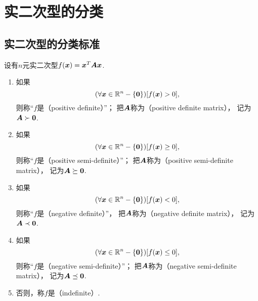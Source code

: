 \section{实二次型的分类}
\subsection{实二次型的分类标准}
\begin{definition}\label{definition:实二次型的分类.实二次型的分类}
设有\(n\)元实二次型\(f(\boldsymbol{x}) = \boldsymbol{x}^T\boldsymbol{A}\boldsymbol{x}\).
\begin{enumerate}
	\item 如果\[
		(\forall\boldsymbol{x}\in\mathbb{R}^n-\{\boldsymbol0\})
		[f(\boldsymbol{x}) > 0],
	\]
	则称“\(f\)是（positive definite）”；
	把\(\boldsymbol{A}\)称为（positive definite matrix），
	记为\(\boldsymbol{A}\succ\boldsymbol0\).

	\item 如果\[
		(\forall\boldsymbol{x}\in\mathbb{R}^n-\{\boldsymbol0\})
		[f(\boldsymbol{x}) \geq 0],
	\]
	则称“\(f\)是（positive semi-definite）”；
	把\(\boldsymbol{A}\)称为（positive semi-definite matrix），
	记为\(\boldsymbol{A}\succeq\boldsymbol0\).

	\item 如果\[
		(\forall\boldsymbol{x}\in\mathbb{R}^n-\{\boldsymbol0\})
		[f(\boldsymbol{x}) < 0],
	\]
	则称“\(f\)是（negative definite）”，
	把\(\boldsymbol{A}\)称为（negative definite matrix），
	记为\(\boldsymbol{A}\prec\boldsymbol0\).

	\item 如果\[
		(\forall\boldsymbol{x}\in\mathbb{R}^n-\{\boldsymbol0\})
		[f(\boldsymbol{x}) \leq 0],
	\]
	则称“\(f\)是（negative semi-definite）”；
	把\(\boldsymbol{A}\)称为（negative semi-definite matrix），
	记为\(\boldsymbol{A}\preceq\boldsymbol0\).

	\item 否则，称\(f\)是（indefinite）.
\end{enumerate}
\end{definition}

